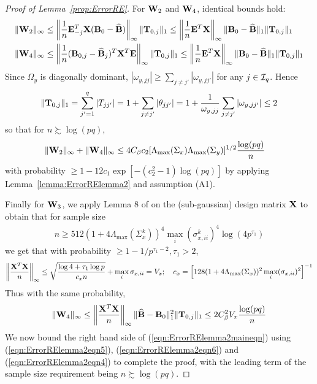 \begin{proof}[Proof of Lemma~\ref{prop:ErrorRE}]
For ${\mathbf{W}}_2$ and ${\mathbf{W}}_4$, identical bounds hold:
%
\begin{align*}
\| {\mathbf{W}}_2 \|_\infty & \leq \left\| \frac{1}{n} {\mathbf{E}}_{-j}^T {\mathbf{X}} ({\mathbf{B}}_0 - \widehat {{\mathbf{B}}}) \right\|_\infty \| {\mathbf{T}}_{0,j} \|_1 \leq
\left\| \frac{1}{n} {\mathbf{E}}^T {\mathbf{X}} \right\|_\infty \| {\mathbf{B}}_0 - \widehat {{\mathbf{B}}} \|_1 \| {\mathbf{T}}_{0,j} \|_1\\
\| {\mathbf{W}}_4 \|_\infty & \leq \left\| \frac{1}{n} ({\mathbf{B}}_{0,j} - \widehat {{\mathbf{B}}}_j)^T {\mathbf{X}}^T {\mathbf{E}} \right\|_\infty \| {\mathbf{T}}_{0,j} \|_1 \leq
\left\| \frac{1}{n} {\mathbf{E}}^T {\mathbf{X}} \right\|_\infty \| {\mathbf{B}}_0 - \widehat {{\mathbf{B}}} \|_1 \| {\mathbf{T}}_{0,j} \|_1\\
\end{align*}
%
Since $\Omega_y$ is diagonally dominant, $|\omega_{y,jj}| \geq \sum_{j \neq j'} |\omega_{y,jj'}|$ for any $j \in {\cal{I}}_q$. Hence
%
$$
\| {\mathbf{T}}_{0,j} \|_1 = \sum_{j'=1}^q | T_{jj'} | = 1 + \sum_{j \neq j'} | \theta_{jj'} | = 1 + \frac{1}{\omega_{y,jj}} \sum_{j \neq j'} | \omega_{y,jj'} | \leq 2
$$
%
so that for $n \succsim \log (pq)$,
%
\begin{align}\label{eqn:ErrorRElemma2eqn6}
\| {\mathbf{W}}_2 \|_\infty + \| {\mathbf{W}}_4 \|_\infty  & \leq
4 C_\beta c_2 [ \Lambda_{\max} (\Sigma_x) \Lambda_{\max} (\Sigma_y) ]^{1/2} \frac{ \log(pq)}{n}
\end{align}
%
with probability $\geq 1 - 12 c_1 \exp [-(c_2^2-1) \log(pq)]$ by applying Lemma~\ref{lemma:ErrorRElemma2} and assumption (A1).

Finally for ${\mathbf{W}}_3$, we apply Lemma 8 of \cite{RavikumarEtal11} on the (sub-gaussian) design matrix ${\mathbf{X}}$ to obtain that for sample size
%
\begin{align}\label{eqn:ErrorRElemma2eqn7}
n \geq 512 ( 1 + 4 \Lambda_{\max} (\Sigma_x^k))^4 \max_i (\sigma_{x,ii}^k )^4 \log (4p^{\tau_1})
\end{align}
%
we get that with probability $ \geq 1 - 1/p^{\tau_1-2}, \tau_1 > 2$,
%
$$
\left\| \frac{{\mathbf{X}}^T {\mathbf{X}}}{n} \right\|_\infty \leq \sqrt{ \frac{ \log 4 + \tau_1 \log p}{c_x n}} + \max_i \sigma_{x,ii} = V_x; \quad
c_x = \left[ 128 ( 1 + 4 \Lambda_{\max} (\Sigma_x)  )^2 \max_i (\sigma_{x,ii})^2 \right]^{-1}
$$
%
Thus with the same probability,
%
\begin{align}\label{eqn:ErrorRElemma2eqn4}
\| {\mathbf{W}}_4 \|_\infty \leq \left\| \frac{{\mathbf{X}}^T {\mathbf{X}}}{n} \right\|_\infty \| \widehat {{\mathbf{B}}} - {\mathbf{B}}_0 \|_1^2 \| {\mathbf{T}}_{0,j} \|_1 
\leq 2 C_\beta^2 V_x \frac{ \log(pq)}{n}
\end{align}
%
We now bound the right hand side of (\ref{eqn:ErrorRElemma2maineqn}) using (\ref{eqn:ErrorRElemma2eqn5}), (\ref{eqn:ErrorRElemma2eqn6}) and (\ref{eqn:ErrorRElemma2eqn4}) to complete the proof, with the leading term of the sample size requirement being $n \succsim \log(pq)$.
\end{proof}

